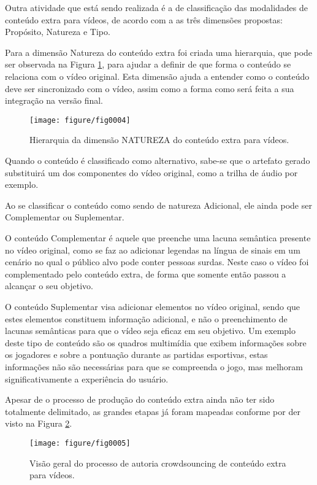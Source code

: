 \documentclass{sig-alternate}
\begin{document}
Outra atividade que está sendo realizada é a de classificação das modalidades de conteúdo extra para vídeos, de acordo com a as três dimensões propostas: Propósito, Natureza e Tipo.

Para a dimensão Natureza do conteúdo extra foi criada uma hierarquia, que pode ser observada na Figura \ref{fig0004}, para ajudar a definir de que forma o conteúdo se relaciona com o vídeo original. Esta dimensão ajuda a entender como o conteúdo deve ser sincronizado com o vídeo, assim como a forma como será feita a sua integração na versão final.



\begin{figure}[!htb]
\centering
\label{fig0004}
\texttt{[image: figure/fig0004]}
\caption{Hierarquia da dimensão NATUREZA do conteúdo extra para vídeos.}
\end{figure}

Quando o conteúdo é classificado como alternativo, sabe-se que o artefato gerado substituirá um dos componentes do vídeo original, como a trilha de áudio por exemplo.

Ao se classificar o conteúdo como sendo de natureza Adicional, ele ainda pode ser Complementar ou Suplementar. 

O conteúdo Complementar é aquele que preenche uma lacuna semântica presente no vídeo original, como se faz ao adicionar legendas na língua de sinais em um cenário no qual o público alvo pode conter pessoas surdas. Neste caso o vídeo foi complementado pelo conteúdo extra, de forma que somente então passou a alcançar o seu objetivo.

O conteúdo Suplementar visa adicionar elementos no vídeo original, sendo que estes elementos constituem informação adicional, e não o preenchimento de lacunas semânticas para que o vídeo seja eficaz em seu objetivo. Um exemplo deste tipo de conteúdo são os quadros multimídia que exibem informações sobre os jogadores e sobre a pontuação durante as partidas esportivas, estas informações não são necessárias para que se compreenda o jogo, mas melhoram significativamente a experiência do usuário.  

Apesar de o processo de produção do conteúdo extra ainda não ter sido totalmente delimitado, as grandes etapas já foram mapeadas conforme por der visto na Figura \ref{fig0005}. 

\begin{figure}[!htb]
\centering
\label{fig0005}
\texttt{[image: figure/fig0005]}
\caption{Visão geral do processo de autoria crowdsouncing de conteúdo extra para vídeos.}
\end{figure}
\end{document}
